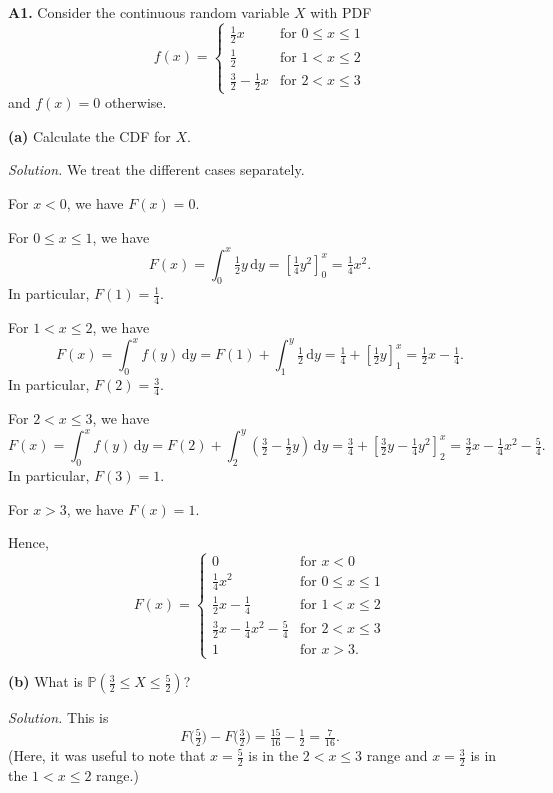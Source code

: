 \documentclass[
  a4paper,
]{book}
\theoremstyle{definition}
\theoremstyle{definition}
\theoremstyle{definition}
\theoremstyle{definition}
\theoremstyle{remark}
\begin{document}
\textbf{A1.} Consider the continuous random variable \(X\) with PDF
\[ f(x) = \begin{cases} \tfrac12x & \text{for $0 \leq x \leq 1$} \\ 
                        \tfrac12 & \text{for $1 < x \leq 2$} \\
                        \tfrac32 - \tfrac12x & \text{for $2 < x \leq 3$} \end{cases} \]
and \(f(x) = 0\) otherwise.

\textbf{(a)} Calculate the CDF for \(X\).

\begin{myanswers}
\emph{Solution.} We treat the different cases separately.

For \(x < 0\), we have \(F(x) = 0\).

For \(0 \leq x \leq 1\), we have
\[ F(x) = \int_0^x \tfrac12 y \, \mathrm dy = \left[\tfrac14y^2\right]_0^x = \tfrac14 x^2 .\]
In particular, \(F(1) = \frac14\).

For \(1 < x \leq 2\), we have
\[ F(x) = \int_0^x f(y)\, \mathrm dy = F(1) + \int_1^y \tfrac12 \, \mathrm dy = \tfrac14 + \left[ \tfrac 12 y\right]_1^x = \tfrac12 x - \tfrac14 .\]
In particular, \(F(2) = \frac34\).

For \(2 < x \leq 3\), we have
\[ F(x) = \int_0^x f(y)\, \mathrm dy = F(2) + \int_2^y \left(\tfrac32 - \tfrac12y\right) \, \mathrm dy = \tfrac34 + \left[ \tfrac 32 y - \tfrac14 y^2\right]_2^x = \tfrac32 x - \tfrac14 x^2 - \tfrac 54 .\]
In particular, \(F(3) = 1\).

For \(x > 3\), we have \(F(x) = 1\).

Hence,
\[ F(x) = \begin{cases}
0 & \text{for $x < 0$} \\
\tfrac14 x^2 & \text{for $0 \leq x \leq 1$} \\
\tfrac12 x - \tfrac14 & \text{for $1 < x \leq 2$} \\
\tfrac32 x - \tfrac14 x^2 - \tfrac 54 & \text{for $2 < x \leq 3$} \\
1 & \text{for $x > 3$.}
\end{cases}
\]

\end{myanswers}

\textbf{(b)} What is \(\mathbb P(\tfrac32 \leq X \leq \tfrac52)\)?

\begin{myanswers}
\emph{Solution.} This is
\[ F\big(\tfrac52\big) - F\big(\tfrac32\big) = \tfrac{15}{16} - \tfrac12 = \tfrac{7}{16} .\]
(Here, it was useful to note that \(x = \tfrac52\) is in the \(2 < x \leq 3\) range and \(x = \tfrac32\) is in the \(1 < x \leq 2\) range.)

\end{myanswers}
\end{document}
